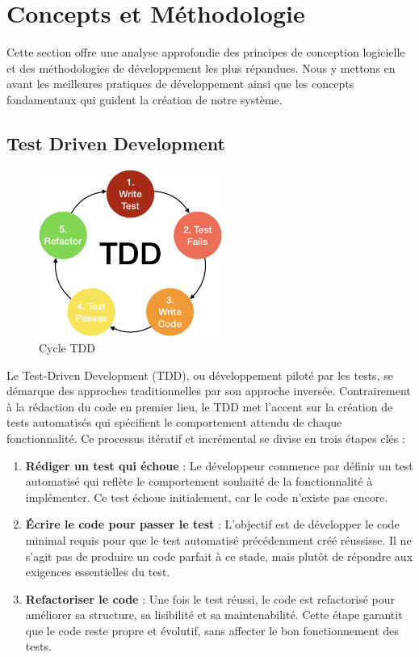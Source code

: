 \section{Concepts et Méthodologie}

Cette section offre une analyse approfondie des principes de conception logicielle et des méthodologies de développement les plus répandues. Nous y mettons en avant les meilleures pratiques de développement ainsi que les concepts fondamentaux qui guident la création de notre système.

\subsection{Test Driven Development}


\begin{figure}[H]
    \centering
    \includegraphics[width=6cm]{Figures/TDD.png}
    \caption{Cycle TDD}
\end{figure}



Le Test-Driven Development (TDD), ou développement piloté par les tests, se démarque des approches traditionnelles par son approche inversée. Contrairement à la rédaction du code en premier lieu, le TDD met l'accent sur la création de tests automatisés qui spécifient le comportement attendu de chaque fonctionnalité. Ce processus itératif et incrémental se divise en trois étapes clés :
\begin{enumerate}

    \item \textbf{Rédiger un test qui échoue} : Le développeur commence par définir un test automatisé qui reflète le comportement souhaité de la fonctionnalité à implémenter. Ce test échoue initialement, car le code n'existe pas encore.

    \item \textbf{Écrire le code pour passer le test} : L'objectif est de développer le code minimal requis pour que le test automatisé précédemment créé réussisse. Il ne s'agit pas de produire un code parfait à ce stade, mais plutôt de répondre aux exigences essentielles du test.

    \item \textbf{Refactoriser le code} : Une fois le test réussi, le code est refactorisé pour améliorer sa structure, sa lisibilité et sa maintenabilité. Cette étape garantit que le code reste propre et évolutif, sans affecter le bon fonctionnement des tests.
\end{enumerate}

